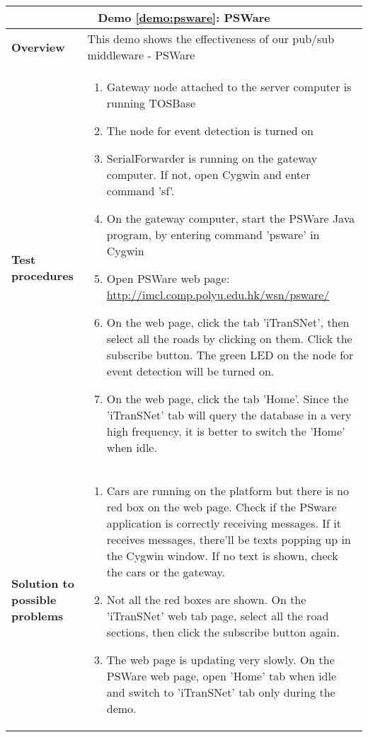 \begin{center}
	\begin{tabular}{ | p{2cm} | p{10cm} | }
		\hline
		\multicolumn{2}{|c|}{\textbf{Demo \ref{demo:psware}: PSWare}} \\ \hline
		\textbf{Overview} &  This demo shows the effectiveness of our pub/sub middleware - PSWare \\ \hline
		\textbf{Test procedures} &
		\begin{enumerate}
		\item Gateway node attached to the server computer is running TOSBase
		\item The node for event detection is turned on
		\item SerialForwarder is running on the gateway computer. If not, open Cygwin and enter command 'sf'.
		\item On the gateway computer, start the PSWare Java program, by entering command 'psware' in Cygwin
		\item Open PSWare web page: \url{http://imcl.comp.polyu.edu.hk/wsn/psware/}
		\item On the web page, click the tab 'iTranSNet', then select all the roads by clicking on them. Click the subscribe button. The green LED on the node for event detection will be turned on.
		\item On the web page, click the tab 'Home'. Since the 'iTranSNet' tab will query the database in a very high frequency, it is better to switch the 'Home' when idle.
		\end{enumerate} \\ \hline
		\textbf{Solution to possible problems} &
		\begin{enumerate}
		\item Cars are running on the platform but there is no red box on the web page. Check if the PSware application is correctly receiving messages. If it receives messages, there'll be texts popping up in the Cygwin window. If no text is shown, check the cars or the gateway. 
		\item Not all the red boxes are shown. On the 'iTranSNet' web tab page, select all the road sections, then click the subscribe button again.
		\item The web page is updating very slowly. On the PSWare web page, open 'Home' tab when idle and switch to 'iTranSNet' tab only during the demo.
		\end{enumerate}  \\
		\hline
	\end{tabular}
\end{center}
